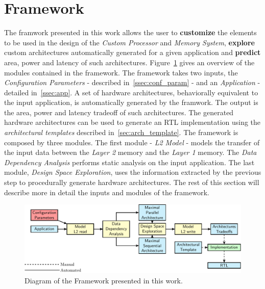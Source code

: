 \section{Framework}
The framwork presented in this work allows the user to \textbf{customize} the elements to be used in the design of the \textit{Custom Processor} and \textit{Memory System}, \textbf{explore} custom architectures automatically generated for a given application and \textbf{predict} area, power and latency of such architectures. Figure~\ref{fig:framework} gives an overview of the modules contained in the framework. The framework takes two inputs, the \textit{Configuration Parameters} - described in~\ref{ssec:conf_param} - and an \textit{Application} - detailed in~\ref{ssec:app}. A set of hardware architectures, behaviorally equivalent to the input application, is automatically generated by the framwork. The output is the area, power and latency tradeoff of such architectures. The generated hardware architectures can be used to generate an RTL implementation using the \textit{architectural templates} described in~\ref{sec:arch_template}.
The framework is composed by three modules. The first module - \textit{L2 Model} - models the transfer of the input data between the \textit{Layer 2} memory and the \textit{Layer 1} memory. The \textit{Data Dependency Analysis} performs static analysis on the input application. The last module, \textit{Design Space Exploration}, uses the information extracted by the previous step to procedurally generate hardware architectures.
The rest of this section will describe more in detail the inputs and modules of the framework.
\begin{figure}[tb] 
\centering
\includegraphics[width=\columnwidth]{images/framework.pdf}
\caption{\small Diagram of the Framework presented in this work.}
\label{fig:framework}
\end{figure}

